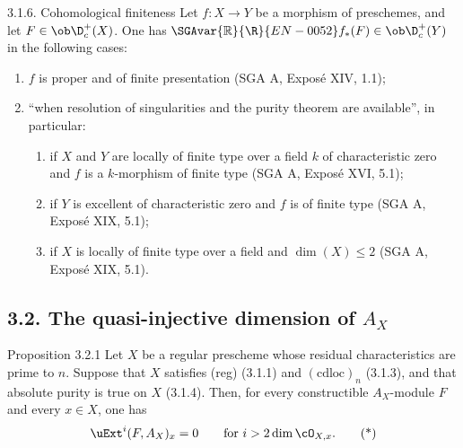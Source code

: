 \begin{statement}{3.1.6. Cohomological finiteness}
Let $f:X\to Y$ be a morphism of preschemes, and let $F\in\ob\D_c^+(X)$. One has $\SGAvar{\mathbb{R}}{\R}{EN-0052} f_*(F)\in\ob\D_c^+(Y)$ in the following cases:
\begin{enumerate}[label=\alph*)]
\item $f$ is proper and of finite presentation (SGA A, Exposé XIV, 1.1);
\item ``when resolution of singularities and the purity theorem are available'', in particular:
\begin{enumerate}[label=(\roman*)]
\item if $X$ and $Y$ are locally of finite type over a field $k$ of characteristic zero and $f$ is a $k$-morphism of finite type (SGA A, Exposé XVI, 5.1);
\item if $Y$ is excellent of characteristic zero and $f$ is of finite type (SGA A, Exposé XIX, 5.1);
\item if $X$ is locally of finite type over a field and $\dim(X)\le2$ (SGA A, Exposé XIX, 5.1).
\end{enumerate}
\end{enumerate}
\end{statement}

\subsection*{3.2. The quasi-injective dimension of $A_X$}

\begin{statement}{Proposition 3.2.1}
Let $X$ be a regular prescheme whose residual characteristics are prime to $n$. Suppose that $X$ satisfies (reg) (3.1.1) and $(\mathrm{cdloc})_n$ (3.1.3), and that absolute purity is true on $X$ (3.1.4). Then, for every constructible $A_X$-module $F$ and every $x\in X$, one has
\begin{equation}
\uExt^i(F,A_X)_x=0\qquad\text{for } i>2\dim\cO_{X,x}.\tag{*}
\end{equation}
\end{statement}

